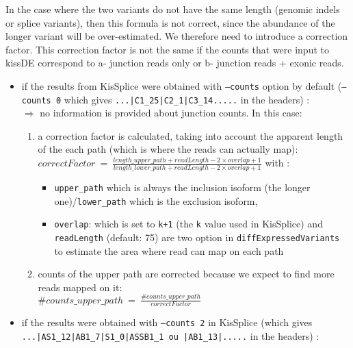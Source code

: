 \documentclass[a4paper,10pt]{article}
\begin{document}
In the case where the two variants do not have the same length (genomic indels or splice variants), then this formula is not correct, since the abundance of the longer variant will be over-estimated. We therefore need to introduce a correction factor.
This correction factor is not the same if the counts that were input to kissDE correspond to a- junction reads only or b- junction reads + exonic reads.
\begin{itemize}
 \item if the results from KisSplice were obtained with \texttt{--counts} option by default (\texttt{--counts 0} which gives \texttt{...|C1\_25|C2\_1|C3\_14.....} in the headers) :\\
  $\Rightarrow$ no information is provided about junction counts. In this case:
 \begin{enumerate}
 \item a correction factor is calculated, taking into account the apparent length of the each path (which is where the reads can actually map):\\
   $correctFactor\:=\: \frac{length\_upper\_path + readLength - 2 \times overlap + 1}{length\_lower\_path + readLength - 2\times overlap + 1}$ with :
 \begin{itemize}
  \item \texttt{upper\_path} which is always the inclusion isoform (the longer one)/\texttt{lower\_path} which is the exclusion isoform,
  \item \texttt{overlap}: which is set to \texttt{k+1} (the \texttt{k} value used in KisSplice) and \texttt{readLength} (default: 75) are two option in \texttt{diffExpressedVariants} to estimate the area where read can map on each path
   \end{itemize}
            \item counts of the upper path are corrected because we expect to find more reads mapped on it:\\
            $\#counts\_upper\_path \:=\:  \frac{\#counts\_upper\_path}{correctFactor} $
 \end{enumerate}
 \item if the results were obtained with \texttt{--counts 2} in KisSplice (which gives \texttt{...|AS1\_12|AB1\_7|S1\_0|ASSB1\_1 ou |AB1\_13|.....} in the headers) :\\

\end{itemize}
\end{document}
